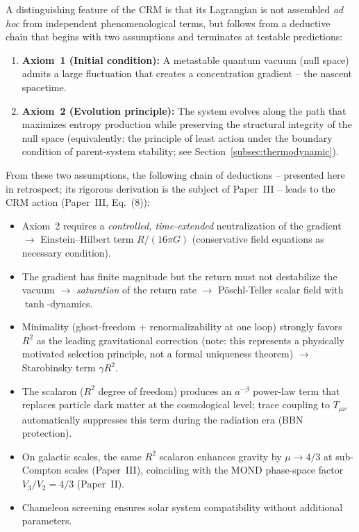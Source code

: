\documentclass[aps,prd,twocolumn,superscriptaddress,nofootinbib]{revtex4-2}
\begin{document}
A distinguishing feature of the CRM is that its Lagrangian is not assembled \textit{ad hoc} from independent phenomenological terms, but follows from a deductive chain that begins with two assumptions and terminates at testable predictions:

\begin{enumerate}
\item \textbf{Axiom~1 (Initial condition):} A metastable quantum vacuum (null space) admits a large fluctuation that creates a concentration gradient -- the nascent spacetime.
\item \textbf{Axiom~2 (Evolution principle):} The system evolves along the path that maximizes entropy production while preserving the structural integrity of the null space (equivalently: the principle of least action under the boundary condition of parent-system stability; see Section~\ref{subsec:thermodynamic}).
\end{enumerate}

From these two assumptions, the following chain of deductions -- presented here in retrospect; its rigorous derivation is the subject of Paper~III -- leads to the CRM action (Paper~III, Eq.~(8)):
\begin{itemize}
\item Axiom~2 requires a \textit{controlled, time-extended} neutralization of the gradient $\to$ Einstein--Hilbert term $R/(16\pi G)$ (conservative field equations as necessary condition).
\item The gradient has finite magnitude but the return must not destabilize the vacuum $\to$ \textit{saturation} of the return rate $\to$ P\"oschl-Teller scalar field with $\tanh$-dynamics.
\item Minimality (ghost-freedom + renormalizability at one loop) strongly favors $R^2$ as the leading gravitational correction (note: this represents a physically motivated selection principle, not a formal uniqueness theorem) $\to$ Starobinsky term $\gamma R^2$.
\item The scalaron ($R^2$ degree of freedom) produces an $a^{-\beta}$ power-law term that replaces particle dark matter at the cosmological level; trace coupling to $T_{\mu\nu}$ automatically suppresses this term during the radiation era (BBN protection).
\item On galactic scales, the same $R^2$ scalaron enhances gravity by $\mu \to 4/3$ at sub-Compton scales (Paper~III), coinciding with the MOND phase-space factor $V_3/V_2 = 4/3$ (Paper~II).
\item Chameleon screening ensures solar system compatibility without additional parameters.
\end{itemize}
\end{document}
